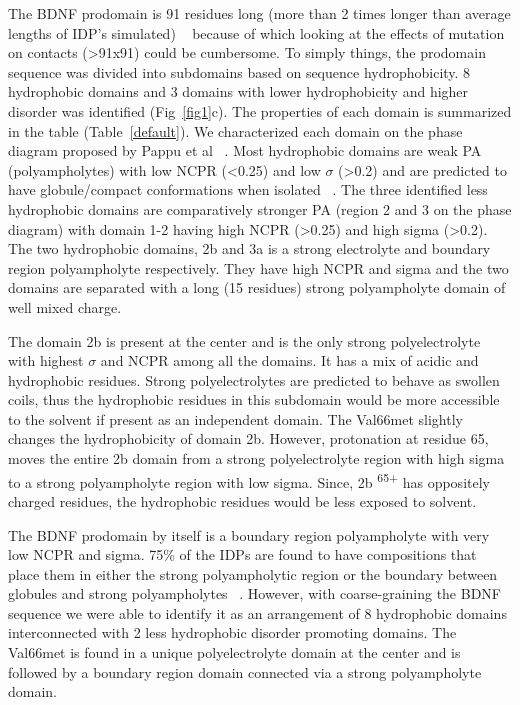 \documentclass[journal=jacsat,manuscript=article]{achemso}
\begin{document}
The BDNF prodomain is 91 residues long (more than 2 times longer than average lengths of IDP's simulated) ~\cite{Henriques, Rauscher2017, Meng2018} because of which looking at the effects of mutation on contacts (\textgreater 91x91) could be cumbersome. To simply things, the prodomain sequence was divided into subdomains based on sequence hydrophobicity. 8 hydrophobic domains and 3 domains with lower hydrophobicity and higher disorder was identified (Fig~\ref{fig1}c). 
The properties of each domain is summarized in the table (Table~\ref{default}).  We characterized each domain on the phase diagram proposed by Pappu et al ~\cite {Mao2010a,Das2013a}. Most hydrophobic domains are weak PA (polyampholytes) with low NCPR (\textless 0.25) and low $\sigma$  (\textgreater 0.2) and are predicted to have globule/compact conformations when isolated ~\cite {Das2013a}. The three identified less hydrophobic domains are comparatively stronger PA (region 2 and 3 on the phase diagram)  with domain 1-2 having high NCPR (\textgreater 0.25) and high sigma (\textgreater 0.2). The two hydrophobic domains, 2b and 3a is a strong electrolyte and boundary region polyampholyte respectively. They have high NCPR and sigma and the two domains are separated with a long (15 residues) strong polyampholyte domain of well mixed charge.

The domain 2b is present at the center and is the only strong polyelectrolyte with highest $\sigma$ and NCPR among all the domains. It has a mix of acidic and hydrophobic residues. Strong polyelectrolytes are predicted to behave as swollen coils, thus the hydrophobic residues in this subdomain would be more accessible to the solvent if present as an independent domain. The Val66met slightly changes the hydrophobicity of domain 2b. However, protonation at residue 65, moves the entire 2b domain from a strong polyelectrolyte region with high sigma to a strong polyampholyte region with low sigma. Since, 2b \textsuperscript{65+} has oppositely charged residues, the hydrophobic residues would be less exposed to solvent. 

The BDNF prodomain by itself is a boundary region polyampholyte with very low NCPR and sigma. 75\% of the IDPs are found to have compositions that place them in either the strong polyampholytic region or the boundary between globules and strong polyampholytes ~\cite {Das2015a}. However, with coarse-graining the BDNF sequence we were able to identify it as an arrangement of 8 hydrophobic domains interconnected with 2 less hydrophobic disorder promoting domains. The Val66met is found in a unique polyelectrolyte domain at the center and is followed by a boundary region domain connected via a strong polyampholyte domain. 
\end{document}
